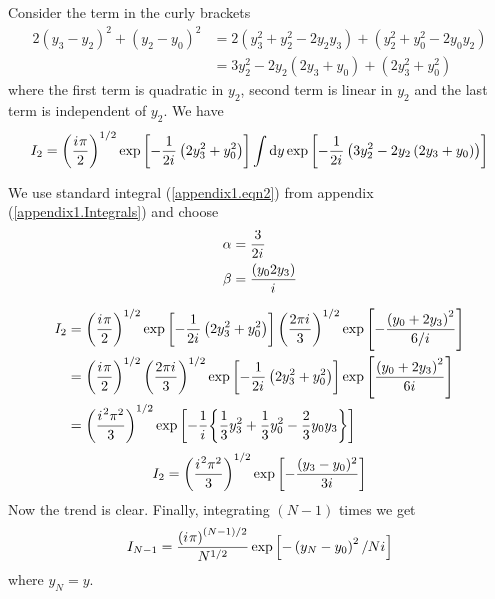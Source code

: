 	Consider the term in the curly brackets
	\begin{align*}
		2\left(y_3 - y_2\right)^2 + \left(y_2 - y_0\right)^2 &= 2\left(y_3^2 + y_2^2 - 2y_2 y_3\right) + \left(y_2^2 + y_0^2 - 2 y_0 y_2\right) \\
		&= 3 y_2^2 - 2y_2 \left(2y_3 + y_0\right) + \left(2 y_3^2 + y_0^2\right)
	\end{align*}
	where the first term is quadratic in $y_2$, second term is linear in $y_2$ and the last term is independent of $y_2$. We have
	\begin{equation}
		I_2 = \left(\frac{{i\mkern1mu} \pi}{2}\right)^{1/2} \exp\left[-\frac{1}{2{i\mkern1mu}}\left(2 y_3^2 + y_0^2\right)\right] \int \dd{y} \exp\left[-\frac{1}{2{i\mkern1mu}} \left(3 y_2^2 - 2y_2 \left(2 y_3 + y_0\right)\right) \right]
	\end{equation}
	
	We use standard integral (\ref{appendix1.eqn2}) from appendix (\ref{appendix1.Integrals}) and choose
	\begin{align}
		\alpha &= \frac{3}{2{i\mkern1mu}} \\
		\beta &= \frac{\left(y_0 2 y_3\right)}{{i\mkern1mu}}
	\end{align}
	
	\begin{align*}
		I_2 
		&= \left(\frac{{i\mkern1mu} \pi}{2}\right)^{1/2} \exp\left[-\frac{1}{2{i\mkern1mu}} \left(2 y_3^2 + y_0^2\right)\right] \left(\frac{2\pi {i\mkern1mu}}{3}\right)^{1/2} \exp\left[-\frac{\left(y_0 + 2 y_3\right)^2}{6/{i\mkern1mu}}\right] \\
		&= \left(\frac{{i\mkern1mu} \pi}{2}\right)^{1/2} \left(\frac{2\pi {i\mkern1mu}}{3}\right)^{1/2}  \exp\left[-\frac{1}{2{i\mkern1mu}} \left(2 y_3^2 + y_0^2\right)\right]  \exp\left[\frac{\left(y_0 + 2 y_3\right)^2}{6{i\mkern1mu}}\right] \\
		&= \qty(\frac{{i\mkern1mu}^2 \pi^2}{3})^{1/2} \exp\left[-\frac{1}{{i\mkern1mu}}\qty{\frac{1}{3} y_3^2 + \frac{1}{3} y_0^2 -\frac{2}{3} y_0 y_3}\right]
	\end{align*}
	\begin{equation}
		I_2 = \qty(\frac{{i\mkern1mu}^2 \pi^2}{3})^{1/2} \exp\left[-\frac{(y_3-y_0)^2}{3{i\mkern1mu}}\right]
		\label{chapter12.eqn17-path-integral-free-particle}
	\end{equation}
	Now the trend is clear. Finally, integrating $(N-1)$ times we get
	\begin{equation}
		I_{N-1} = \frac{\left({i\mkern1mu} \pi\right)^{(N-1)/2}}{N^{1/2}} \exp\left[-\left(y_N - y_0\right)^2/N{i\mkern1mu}
		\right]
	\end{equation}
	where $y_N = y$.\\

